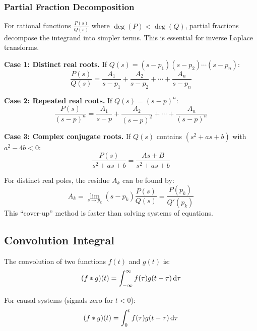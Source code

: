 \subsubsection{Partial Fraction Decomposition}

For rational functions $\frac{P(s)}{Q(s)}$ where $\deg(P) < \deg(Q)$, partial fractions decompose the integrand into simpler terms. This is essential for inverse Laplace transforms.

\textbf{Case 1: Distinct real roots.} If $Q(s) = (s - p_1)(s - p_2)\cdots(s - p_n)$:
\begin{equation}
\frac{P(s)}{Q(s)} = \frac{A_1}{s - p_1} + \frac{A_2}{s - p_2} + \cdots + \frac{A_n}{s - p_n}
\end{equation}

\textbf{Case 2: Repeated real roots.} If $Q(s) = (s - p)^n$:
\begin{equation}
\frac{P(s)}{(s - p)^n} = \frac{A_1}{s - p} + \frac{A_2}{(s - p)^2} + \cdots + \frac{A_n}{(s - p)^n}
\end{equation}

\textbf{Case 3: Complex conjugate roots.} If $Q(s)$ contains $(s^2 + as + b)$ with $a^2 - 4b < 0$:
\begin{equation}
\frac{P(s)}{s^2 + as + b} = \frac{As + B}{s^2 + as + b}
\end{equation}

\begin{keyconceptbox}[title=Cover-Up Method for Residues]
For distinct real poles, the residue $A_k$ can be found by:
\begin{equation}
A_k = \lim_{s \to p_k} (s - p_k) \frac{P(s)}{Q(s)} = \frac{P(p_k)}{Q'(p_k)}
\end{equation}
This ``cover-up'' method is faster than solving systems of equations.
\end{keyconceptbox}

\subsection{Convolution Integral}

The convolution of two functions $f(t)$ and $g(t)$ is:
\begin{equation}
(f \ast g)(t) = \int_{-\infty}^{\infty} f(\tau) g(t - \tau) \, \mathrm{d}\tau
\end{equation}

For causal systems (signals zero for $t < 0$):
\begin{equation}
(f \ast g)(t) = \int_0^t f(\tau) g(t - \tau) \, \mathrm{d}\tau
\end{equation}

